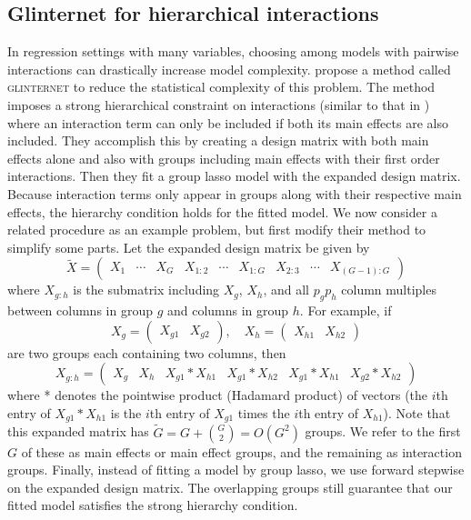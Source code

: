 \documentclass{imsart}
\begin{document}
\subsection{Glinternet for hierarchical interactions}
\label{sec:glint}
In regression settings with many variables, choosing among models with pairwise interactions can drastically increase model complexity. \cite{glint} propose a method called \textsc{glinternet} to reduce the statistical complexity of this problem. The method imposes a strong hierarchical constraint on interactions (similar to that in \cite{bien:hierarchical}) where an interaction term can only be included if both its main effects are also included. They accomplish this by creating a design matrix with both main effects alone and also with groups including main effects with their first order interactions. Then they fit a group lasso model with the expanded design matrix. Because interaction terms only appear in groups along with their respective main effects, the hierarchy condition holds for the fitted model. We now consider a related procedure as an example problem, but first modify their method to simplify some parts. Let the expanded design matrix be given by
\begin{equation}
\label{eq:glintmat}
\tilde X = \begin{pmatrix} X_1 & \cdots & X_G & X_{1:2} & \cdots & X_{1:G} & X_{2:3} & \cdots & X_{(G-1):G}  \end{pmatrix}
\end{equation}
where $X_{g:h}$ is the submatrix including $X_g$, $X_h$, and all
$p_gp_h$  column multiples between columns in group $g$ and columns
in group $h$. For example, if
\[
X_g = \begin{pmatrix} X_{g1} & X_{g2} \end{pmatrix}, \quad
X_h = \begin{pmatrix} X_{h1} & X_{h2} \end{pmatrix}
\]
are two groups each containing two columns, then
\[
X_{g:h} = \begin{pmatrix} X_g & X_h & X_{g1} * X_{h1} & X_{g1} * X_{h2} & X_{g1} * X_{h1} & X_{g2} * X_{h2} \end{pmatrix}
\]
where * denotes the pointwise product (Hadamard product) of vectors
(the $i$th entry of $X_{g1} * X_{h1}$ is the $i$th entry of $X_{g1}$ times
the $i$th entry of $X_{h1}$). Note that this expanded matrix has
$\tilde G = G + \binom{G}{2} = O(G^2)$ groups. We refer to the first
$G$ of these as main effects or main effect groups, and the remaining
as interaction groups. Finally, instead of fitting a
model by group lasso, we use forward stepwise on the expanded design
matrix. The overlapping groups still guarantee that our fitted model
satisfies the strong hierarchy condition. 
\end{document}
